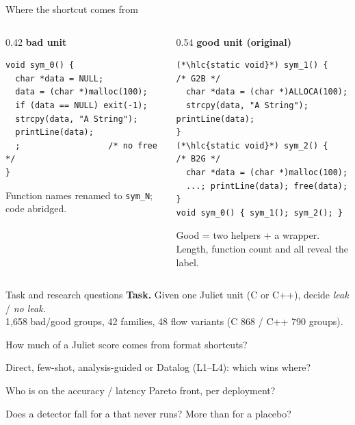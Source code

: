 \begin{frame}[fragile]{Where the shortcut comes from}
  \begin{columns}[T]
    \begin{column}{0.42\textwidth}
      \textbf{bad unit}\\[1pt]
\begin{lstlisting}[style=unit]
void sym_0() {
  char *data = NULL;
  data = (char *)malloc(100);
  if (data == NULL) exit(-1);
  strcpy(data, "A String");
  printLine(data);
  ;                  /* no free */
}
\end{lstlisting}
      \vspace{2pt}
      {\small Function names renamed to \texttt{sym\_N}; code abridged.}
    \end{column}
    \begin{column}{0.54\textwidth}
      \textbf{good unit (original)}\\[1pt]
\begin{lstlisting}[style=unit]
(*\hlc{static void}*) sym_1() {        /* G2B */
  char *data = (char *)ALLOCA(100);
  strcpy(data, "A String"); printLine(data);
}
(*\hlc{static void}*) sym_2() {        /* B2G */
  char *data = (char *)malloc(100);
  ...; printLine(data); free(data);
}
void sym_0() { sym_1(); sym_2(); }
\end{lstlisting}
      {\small Good = two  helpers + a wrapper.\\
      Length, function count and  all reveal the label.}
    \end{column}
  \end{columns}
\end{frame}

\begin{frame}{Task and research questions}
  \textbf{Task.} Given one Juliet unit (C or C++), decide \emph{leak} / \emph{no leak}.\\
  {\small 1,658 bad/good groups, 42 families, 48 flow variants (C 868 / C++ 790 groups).}
  \vspace{2pt}
  \begin{description}[RQ4~Robustness]
    \item[RQ1 Validity] How much of a Juliet score comes from format shortcuts?
    \item[RQ2 Strategy] Direct, few-shot, analysis-guided or Datalog (L1--L4): which wins where?
    \item[RQ3 Efficiency] Who is on the accuracy / latency Pareto front, per deployment?
    \item[RQ4 Robustness] Does a detector fall for a  that never runs? More than for a placebo?
  \end{description}
\end{frame}
